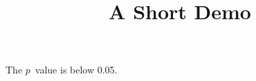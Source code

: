 \documentclass[article]{jss}
\title{A Short Demo}
\begin{document}
The $p$~value is below 0.05.
\end{document}
